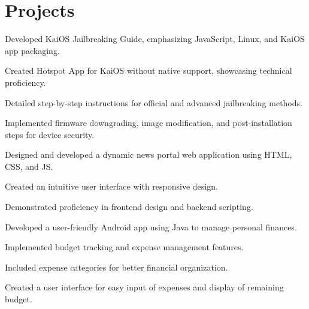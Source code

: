 \documentclass[]{swapnanil-resume}
\begin{document}
\begin{minipage}[t]{0.66\textwidth} 


\section{Projects}
\vspace{\topsep}
\begin{tightemize}
\item Developed KaiOS Jailbreaking Guide, emphasizing JavaScript, Linux, and KaiOS app packaging.
\item Created Hotspot App for KaiOS without native support, showcasing technical proficiency.
\item Detailed step-by-step instructions for official and advanced jailbreaking methods.
\item Implemented firmware downgrading, image modification, and post-installation steps for device security.
\end{tightemize}
\sectionsep
    
\begin{tightemize}
\item Designed and developed a dynamic news portal web application using HTML, CSS, and JS.
\item Created an intuitive user interface with responsive design.
\item Demonstrated proficiency in  frontend design and backend scripting.
\end{tightemize}
\sectionsep

\begin{tightemize}
\item Developed a user-friendly Android app using Java to manage personal finances.
\item Implemented budget tracking and expense management features.
\item Included expense categories for better financial organization.
\item Created a user interface for easy input of expenses and display of remaining budget.
\end{tightemize}
\sectionsep


\end{minipage}
\end{document}
